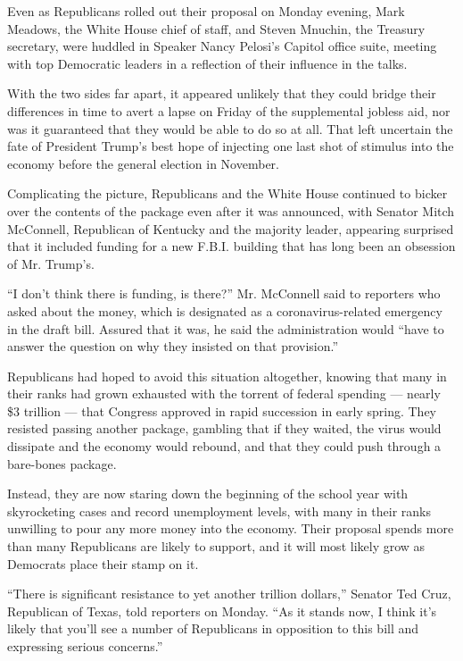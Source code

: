 Even as Republicans rolled out their proposal on Monday evening, Mark
Meadows, the White House chief of staff, and Steven Mnuchin, the
Treasury secretary, were huddled in Speaker Nancy Pelosi's Capitol
office suite, meeting with top Democratic leaders in a reflection of
their influence in the talks.

With the two sides far apart, it appeared unlikely that they could
bridge their differences in time to avert a lapse on Friday of the
supplemental jobless aid, nor was it guaranteed that they would be able
to do so at all. That left uncertain the fate of President Trump's best
hope of injecting one last shot of stimulus into the economy before the
general election in November.

Complicating the picture, Republicans and the White House continued to
bicker over the contents of the package even after it was announced,
with Senator Mitch McConnell, Republican of Kentucky and the majority
leader, appearing surprised that it included funding for a new F.B.I.
building that has long been an obsession of Mr. Trump's.

``I don't think there is funding, is there?'' Mr. McConnell said to
reporters who asked about the money, which is designated as a
coronavirus-related emergency in the draft bill. Assured that it was, he
said the administration would ``have to answer the question on why they
insisted on that provision.''

Republicans had hoped to avoid this situation altogether, knowing that
many in their ranks had grown exhausted with the torrent of federal
spending --- nearly \$3 trillion --- that Congress approved in rapid
succession in early spring. They resisted passing another package,
gambling that if they waited, the virus would dissipate and the economy
would rebound, and that they could push through a bare-bones package.

Instead, they are now staring down the beginning of the school year with
skyrocketing cases and record unemployment levels, with many in their
ranks unwilling to pour any more money into the economy. Their proposal
spends more than many Republicans are likely to support, and it will
most likely grow as Democrats place their stamp on it.

``There is significant resistance to yet another trillion dollars,''
Senator Ted Cruz, Republican of Texas, told reporters on Monday. ``As it
stands now, I think it's likely that you'll see a number of Republicans
in opposition to this bill and expressing serious concerns.''

